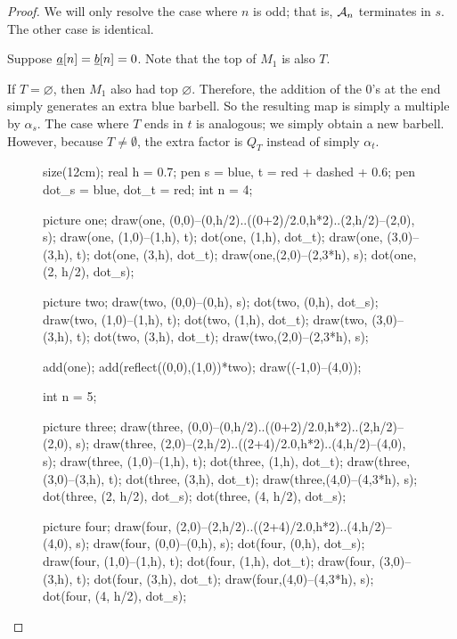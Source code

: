 \begin{proof}
	We will only resolve the case where $n$ is odd; that is, $\AA_n$ terminates in $s$.  The other case is identical.
	\begin{enumerate}[(i)]
		\ii Suppose $\ul a[n] = \ul b[n] = 0$.  Note that the top of $M_1$ is also $T$.
		\begin{itemize}
			\ii If $T = \varnothing$, then $M_1$ also had top $\varnothing$.  Therefore, the addition of the $0$'s at the end simply generates an extra blue barbell.  So the resulting map is simply a multiple by $\alpha_s$.
			\ii The case where $T$ ends in $t$ is analogous; we simply obtain a new barbell.  However, because $T \neq \emptyset$, the extra factor is $Q_T$ instead of simply $\alpha_t$. 
			\begin{figure}[ht]
				\centering
				\begin{asy}
					size(12cm);
					real h = 0.7;
					pen s = blue, t = red + dashed + 0.6;
					pen dot_s = blue, dot_t = red;
					int n = 4;

					picture one;
					draw(one, (0,0)--(0,h/2)..((0+2)/2.0,h*2)..(2,h/2)--(2,0), s);
					draw(one, (1,0)--(1,h), t);
					dot(one, (1,h), dot_t);
					draw(one, (3,0)--(3,h), t);
					dot(one, (3,h), dot_t);
					draw(one,(2,0)--(2,3*h), s);
					dot(one, (2, h/2), dot_s);

					picture two;
					draw(two, (0,0)--(0,h), s);
					dot(two, (0,h), dot_s);
					draw(two, (1,0)--(1,h), t);
					dot(two, (1,h), dot_t);
					draw(two, (3,0)--(3,h), t);
					dot(two, (3,h), dot_t);
					draw(two,(2,0)--(2,3*h), s);

					add(one); add(reflect((0,0),(1,0))*two);
					draw((-1,0)--(4,0));

					int n = 5;

					picture three;
					draw(three, (0,0)--(0,h/2)..((0+2)/2.0,h*2)..(2,h/2)--(2,0), s);
					draw(three, (2,0)--(2,h/2)..((2+4)/2.0,h*2)..(4,h/2)--(4,0), s);
					draw(three, (1,0)--(1,h), t);
					dot(three, (1,h), dot_t);
					draw(three, (3,0)--(3,h), t);
					dot(three, (3,h), dot_t);
					draw(three,(4,0)--(4,3*h), s);
					dot(three, (2, h/2), dot_s);
					dot(three, (4, h/2), dot_s);

					picture four;
					draw(four, (2,0)--(2,h/2)..((2+4)/2.0,h*2)..(4,h/2)--(4,0), s);
					draw(four, (0,0)--(0,h), s);
					dot(four, (0,h), dot_s);
					draw(four, (1,0)--(1,h), t);
					dot(four, (1,h), dot_t);
					draw(four, (3,0)--(3,h), t);
					dot(four, (3,h), dot_t);
					draw(four,(4,0)--(4,3*h), s);
					dot(four, (4, h/2), dot_s);


\end{asy}
\end{figure}
\end{itemize}
\end{enumerate}
\end{proof}
